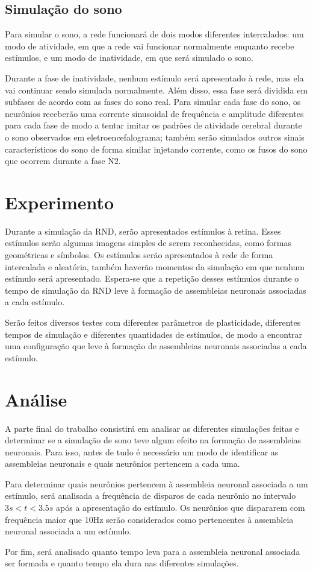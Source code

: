 \subsection{Simulação do sono}

Para simular o sono, a rede funcionará de dois modos diferentes intercalados: um modo de atividade, em que a rede vai funcionar
normalmente enquanto recebe estímulos, e um modo de inatividade, em que será simulado o sono. 

Durante a fase de inatividade, nenhum estímulo será apresentado à rede, mas ela vai continuar sendo simulada normalmente. Além
disso, essa fase será dividida em subfases de acordo com as fases do sono real. Para simular cada fase do sono, os neurônios
receberão uma corrente sinusoidal de frequência e amplitude diferentes para cada fase de modo a tentar imitar os padrões de
atividade cerebral durante o sono observados em eletroencefalograma; também serão simulados outros sinais característicos do sono
de forma similar injetando corrente, como os fusos do sono que ocorrem durante a fase N2.

\section{Experimento}\label{section_experimento}

Durante a simulação da RND, serão apresentados estímulos à retina. Esses estímulos serão algumas imagens simples de serem
reconhecidas, como formas geométricas e símbolos. Os estímulos serão apresentados à rede de forma intercalada e aleatória, também
haverão momentos da simulação em que nenhum estímulo será apresentado. Espera-se que a repetição desses estímulos durante o tempo
de simulação da RND leve à formação de assembleias neuronais associadas a cada estímulo.

Serão feitos diversos testes com diferentes parâmetros de plasticidade, diferentes tempos de simulação e diferentes quantidades de
estímulos, de modo a encontrar uma configuração que leve à formação de assembleias neuronais associadas a cada estímulo.

\section{Análise}

A parte final do trabalho consistirá em analisar as diferentes simulações feitas e determinar se a simulação de sono teve algum
efeito na formação de assembleias neuronais. Para isso, antes de tudo é necessário um modo de identificar as assembleias neuronais
e quais neurônios pertencem a cada uma.

Para determinar quais neurônios pertencem à assembleia neuronal associada a um estímulo, será analisada a frequência de disparos de
cada neurônio no intervalo $3s < t < 3.5s$ após a apresentação do estímulo. Os neurônios que dispararem com frequência maior que
10Hz serão considerados como pertencentes à assembleia neuronal associada a um estímulo.

Por fim, será analisado quanto tempo leva para a assembleia neuronal associada ser formada e quanto tempo ela dura nas diferentes
simulações.